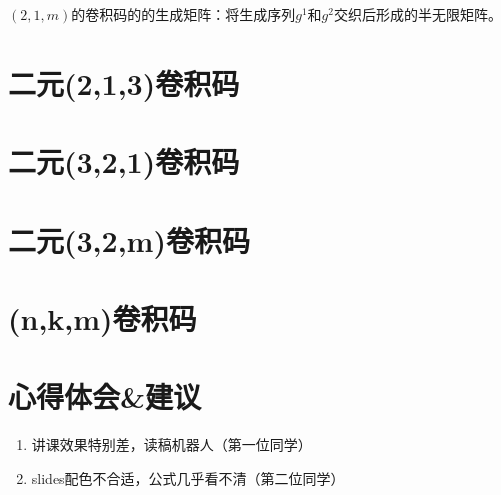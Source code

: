 \documentclass[onecolumn,oneside]{BUPTHomework}
\begin{document}
  $(2,1,m)$的卷积码的的生成矩阵：将生成序列$g^{1}$和$g^{2}$交织后形成的半无限矩阵。

  \section*{二元(2,1,3)卷积码}

  \section*{二元(3,2,1)卷积码}

  \section*{二元(3,2,m)卷积码}

  \section*{(n,k,m)卷积码}

  \section*{心得体会\&建议}

  \begin{enumerate}
    \item 讲课效果特别差，读稿机器人（第一位同学）
    \item slides配色不合适，公式几乎看不清（第二位同学）
  \end{enumerate}
  
\end{document}
